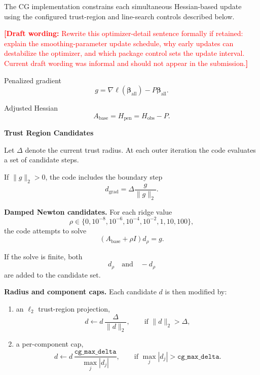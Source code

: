 \documentclass{article}
\newcommand{\jssplaceholder}[1]{\par\noindent\textcolor{red}{\textbf{[Draft wording:} #1\textbf{]}}\par}
\begin{document}
The CG implementation constrains each simultaneous Hessian-based update using the configured trust-region and line-search controls described below.

\jssplaceholder{Rewrite this optimizer-detail sentence formally if retained: explain the smoothing-parameter update schedule, why early updates can destabilize the optimizer, and which package control sets the update interval. Current draft wording was informal and should not appear in the submission.}

Penalized gradient
\begin{equation*}
g = \nabla \ell(\bm{\beta}_{\text{all}}) - P\bm{\beta}_{\text{all}}.
\end{equation*}

Adjusted Hessian
\begin{equation*}
A_{\text{base}} = H_{\text{pen}} = H_{\text{obs}} - P.
\end{equation*}

\textbf{Trust Region Candidates}

Let $\Delta$ denote the current trust radius. At each outer iteration the code evaluates a set of
candidate steps.

If $\|g\|_2 > 0$, the code includes the boundary step
\begin{equation*}
d_{\text{grad}} = \Delta \frac{g}{\|g\|_2}.
\end{equation*}

\textbf{Damped Newton candidates.}
For each ridge value
\begin{equation*}
\rho \in \{0, 10^{-8}, 10^{-6}, 10^{-4}, 10^{-2}, 1, 10, 100\},
\end{equation*}
the code attempts to solve
\begin{equation*}
\left(A_{\text{base}} + \rho I\right)d_\rho = g.
\end{equation*}

If the solve is finite, both
\begin{equation*}
d_\rho \quad \text{and} \quad -d_\rho
\end{equation*}
are added to the candidate set.

\textbf{Radius and component caps.}
Each candidate $d$ is then modified by:
\begin{enumerate}
\item an $\ell_2$ trust-region projection,
\begin{equation*}
d \leftarrow d\,\frac{\Delta}{\|d\|_2}, \qquad \text{if } \|d\|_2 > \Delta,
\end{equation*}
\item a per-component cap,
\begin{equation*}
d \leftarrow d\,\frac{\texttt{cg\_max\_delta}}{\max_j |d_j|},
\qquad \text{if } \max_j |d_j| > \texttt{cg\_max\_delta}.
\end{equation*}
\end{enumerate}
\end{document}
